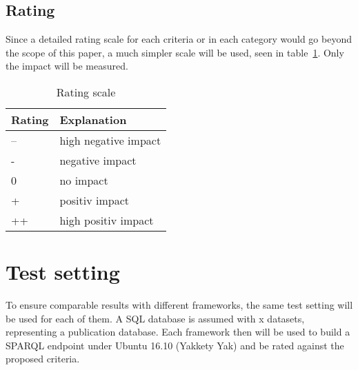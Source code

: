 \subsection{Rating}

Since a detailed rating scale for each criteria or in each category would go beyond the scope of this paper, a much simpler scale will be used, seen in table~\ref{tbl_rating}. Only the impact will be measured.

\begin{table}[htbp]
\centering
\begin{tabular}{|l|l|}
\hline
\textbf{Rating} & \textbf{Explanation} \\ \hline
--              & high negative impact \\ \hline
-               & negative impact      \\ \hline
0               & no impact            \\ \hline
+               & positiv impact       \\ \hline
++              & high positiv impact  \\ \hline
\end{tabular}
\caption{Rating scale}
\label{tbl_rating}
\end{table}

\section{Test setting}
To ensure comparable results with different frameworks, the same test setting will be used for each of them. A SQL database is assumed with x  datasets, representing a publication database. Each framework then will be used to build a SPARQL endpoint under Ubuntu 16.10 (Yakkety Yak) and be rated against the proposed criteria.